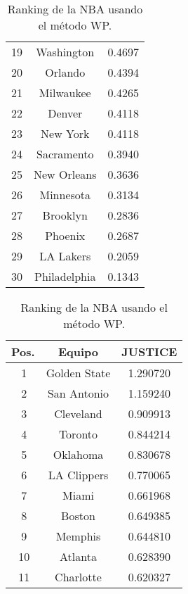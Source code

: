 \documentclass[a4paper]{article}
\newcommand{\bigfatgreen}{\begin{tikzpicture}[x=0.5pt,y=0.6pt,yscale=-.5,xscale=.5]
\draw  [fill=ForestGreen!70,fill opacity=1] (100,123.22) -- (113.25,113) -- (126.5,123.22) -- (119.88,123.22) -- (119.88,138.54) -- (106.63,138.54) -- (106.63,123.22) -- cycle ;
\end{tikzpicture}}
\newcommand{\bigfatred}{\begin{tikzpicture}[x=0.5pt,y=0.6pt,yscale=-.5,xscale=.5, rotate= 180]
\draw  [fill=red!70,fill opacity=1] (100,123.22) -- (113.25,113) -- (126.5,123.22) -- (119.88,123.22) -- (119.88,138.54) -- (106.63,138.54) -- (106.63,123.22) -- cycle ;
\end{tikzpicture}}
\begin{document}
\begin{table}[h]
{\begin{subtable}{0.33\textwidth}
\begin{tabular}{|c|c|c|}
                19 & Washington & 0.4697 \\
                20 & Orlando & 0.4394 \\
                21 & Milwaukee & 0.4265 \\
                22 & Denver & 0.4118 \\
                23 & New York & 0.4118 \\
                24 & Sacramento & 0.3940 \\
                25 & New Orleans & 0.3636 \\
                26 & Minnesota & 0.3134 \\
                27 & Brooklyn & 0.2836 \\
                28 & Phoenix & 0.2687 \\
                29 & LA Lakers & 0.2059 \\
                30 & Philadelphia & 0.1343 \\
                \hline
            \end{tabular}
            \caption{Ranking de la NBA usando el m\'etodo WP.}
            \label{subtab:NBA_WP}
        \end{subtable}%
        \begin{subtable}{0.33\textwidth}
            \centering
            \begin{tabular}{|c|c|c|}
                \hline
            	Pos. & Equipo & JUSTICE \\
            	\hline
                \bigfatgreen\,1 & Golden State & 1.290720 \\
                \bigfatgreen\,2 & San Antonio & 1.159240 \\
                \bigfatred\,3 & Cleveland & 0.909913 \\
                \bigfatred\,4 & Toronto & 0.844214 \\
                \bigfatred\,5 & Oklahoma & 0.830678 \\
                \bigfatgreen\,6 & LA Clippers & 0.770065 \\
                \bigfatred\,7 & Miami & 0.661968 \\
                \bigfatgreen\,8 & Boston & 0.649385 \\
                \bigfatgreen\,9 & Memphis & 0.644810 \\
                \bigfatred\,10 & Atlanta & 0.628390 \\
                \bigfatred\,11 & Charlotte & 0.620327 \\

\end{tabular}
\end{subtable}}
\end{table}
\end{document}
